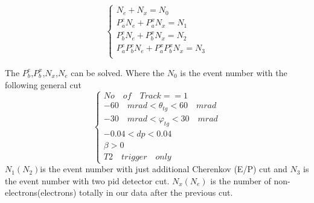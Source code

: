 \begin{equation}  
\left\{  
             \begin{array}{lr}  
             N_{e}+N_{x}=N_{0} \\  
             P_{a}^{e} N_{e}+ P_{a}^{x} N_{x}=N_{1} \\    
             P_{b}^{e} N_{e}+ P_{b}^{x} N_{x}=N_{2} \\     
             P_{a}^{e} P_{b}^{e} N_{e}+ P_{a}^{x} P_{b}^{x} N_{x}=N_{3}\\  
             \end{array}  
\right.  
\label{PID_eq2}
\end{equation}  

The $P_{b}^{e}$,$P_{b}^{x}$,$N_{x}$,$N_{e}$ can be solved. Where the $N_{0}$ is the event number with the following general cut
\begin{equation}  \label{pid_eq3}
\left\{  
             \begin{array}{lr}  
             No \quad of \quad Track ==1 \\  
             -60\quad mrad< \theta_{tg} <60 \quad mrad \\    
             -30\quad mrad<\varphi_{tg} <30\quad  mrad  \\     
             -0.04<dp<0.04\\
             \beta>0  \\
             T2 \quad trigger\quad only
             \end{array}  
\right.  
\end{equation}  
$N_{1}(N_{2})$is the event number with just  additional Cherenkov (E/P) cut  and $N_{3}$ is the event number with two pid detector cut. $N_{x}(N_{e}) $ is the number of non-electrons(electrons) totally in our data after the previous cut. 

